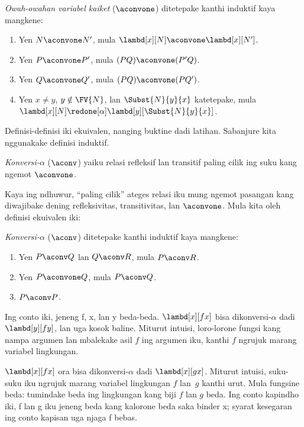 \documentclass[../../../include/open-logic-section]{subfiles}
\begin{document}
\begin{defn} 
  \emph{Owah-owahan variabel kaiket}
  ($\aconvone$) ditetepake kanthi
  induktif kaya mangkene:
  \begin{enumerate}
  \item Yen $N \aconvone N'$, mula
    $\lambd[x][N] \aconvone
    \lambd[x][N']$. 
  \item Yen $P \aconvone P'$, mula
    $(PQ) \aconvone (P'Q)$. 
  \item Yen $Q \aconvone Q'$, mula
    $(PQ) \aconvone (PQ')$. 
  \item Yen $x \neq y$, $y \notin \FV{N}$,
    lan $\Subst{N}{y}{x}$ katetepake,
    mula $\lambd[x][N] \redone[\alpha]
    \lambd[y][\Subst{N}{y}{x}]$.
  \end{enumerate}
\end{defn}

Definisi-definisi iki ekuivalen,
nanging buktine dadi latihan.
Sabanjure kita nggunakake
definisi induktif.

\begin{defn}
  \emph{Konversi-$\alpha$} ($\aconv$)
  yaiku relasi refleksif lan transitif
  paling cilik ing suku kang ngemot
  $\aconvone$.
\end{defn}

Kaya ing ndhuwur, ``paling cilik''
ateges relasi iku mung ngemot pasangan
kang diwajibake dening refleksivitas,
transitivitas, lan $\aconvone$.
Mula kita oleh definisi ekuivalen iki:

\begin{defn} 
  \emph{Konversi-$\alpha$} ($\aconv$)
  ditetepake kanthi induktif kaya mangkene:
  \begin{enumerate}
  \item Yen $P \aconv Q$ lan $Q \aconv R$,
    mula $P \aconv R$.
  \item Yen $P \aconvone Q$, mula
    $P \aconv Q$. 
  \item $P \aconv P$. 
  \end{enumerate}
\end{defn}

\begin{ex}
  Ing conto iki, jeneng f, x, lan y beda-beda. $\lambd[x][f x]$ bisa dikonversi-$\alpha$
  dadi $\lambd[y][f y]$, lan uga
  kosok baline. Miturut intuisi,
  loro-lorone fungsi kang nampa
  argumen lan mbalekake asil $f$
  ing argumen iku, kanthi $f$
  ngrujuk marang variabel lingkungan.

  $\lambd[x][f x]$ ora bisa
  dikonversi-$\alpha$ dadi
  $\lambd[x][g x]$. Miturut intuisi,
  suku-suku iku ngrujuk marang
  variabel lingkungan $f$ lan~$g$
  kanthi urut. Mula fungsine beda:
  tumindake beda ing lingkungan
  kang biji $f$ lan $g$ beda. Ing conto kapindho iki, f lan g iku jeneng beda kang kalorone beda saka binder x; syarat kesegaran ing conto kapisan uga njaga f bebas.
\end{ex}
\end{document}
